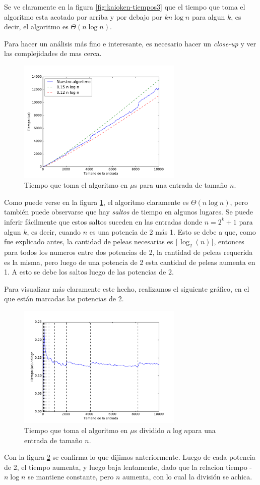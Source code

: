 Se ve claramente en la figura \ref{fig:kaioken-tiempos3} que el tiempo que toma el algoritmo esta acotado por arriba y por debajo por $k n \log n$ para algun $k$, es decir, el algoritmo es $\Theta(n \log n)$.

Para hacer un análisis más fino e interesante, es necesario hacer un \emph{close-up} y ver las complejidades de mas cerca.

\begin{figure}[H]
 \centering
	\includegraphics[width=0.7\textwidth]{img/tiempos/kaioken1.pdf}
	\caption{\footnotesize Tiempo que toma el algoritmo en $\mu$s para una entrada de tamaño $n$.}
	\label{fig:kaioken-tiempos1}
\end{figure}

Como puede verse en la figura \ref{fig:kaioken-tiempos1}, el algoritmo claramente es $\Theta(n \log n)$, pero también puede observarse que hay \emph{saltos} de tiempo en algunos lugares. Se puede inferir fácilmente que estos saltos suceden en las entradas donde $n = 2^k + 1$ para algun $k$, es decir, cuando $n$ es una potencia de 2 más 1. Esto se debe a que, como fue explicado antes, la cantidad de peleas necesarias es $\lceil \log_2(n) \rceil$, entonces para todos los numeros entre dos potencias de 2, la cantidad de peleas requerida es la misma, pero luego de una potencia de 2 esta cantidad de peleas aumenta en 1. A esto se debe los saltos luego de las potencias de 2.

Para visualizar más claramente este hecho, realizamos el siguiente gráfico, en el que están marcadas las potencias de 2.

\begin{figure}[H]
 \centering
	\includegraphics[width=0.7\textwidth]{img/tiempos/kaioken2.pdf}
	\caption{\footnotesize Tiempo que toma el algoritmo en $\mu$s dividido $n\log n$para una entrada de tamaño $n$.}
	\label{fig:kaioken-tiempos2}
\end{figure}

Con la figura \ref{fig:kaioken-tiempos2} se confirma lo que dijimos anteriormente. Luego de cada potencia de 2, el tiempo aumenta, y luego baja lentamente, dado que la relacion tiempo - $n \log n$ se mantiene constante, pero $n$ aumenta, con lo cual la división se achica.
